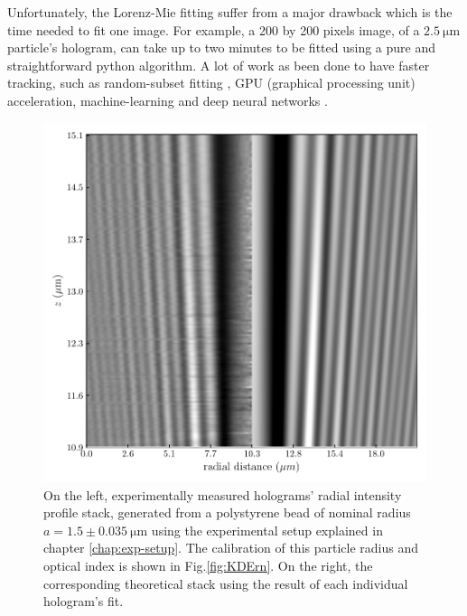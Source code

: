 Unfortunately, the Lorenz-Mie fitting suffer from a major drawback which is the time needed to fit one image. For example, a 200 by 200 pixels image, of a $2.5 ~ \mathrm{\mu m}$ particle's hologram, can take up to two minutes to be fitted using a pure and straightforward python algorithm. A lot of work as been done to have faster tracking, such as random-subset fitting \cite{dimiduk_random-subset_2014}, GPU (graphical processing unit) acceleration, machine-learning \cite{yevick_machine-learning_2014, hannel_machine-learning_2018} and deep neural networks \cite{altman_catch_2020}.

\begin{figure}[H]
	\centering
	\includegraphics{02_body/chapter2/images/test_tableau2.pdf}
	\caption{On the left, experimentally measured  holograms' radial intensity profile stack, generated from a polystyrene bead of nominal radius $a = 1.5 \pm 0.035 ~ \mathrm{\mu m} $ using the experimental setup explained in chapter \ref{chap:exp-setup}. The calibration of this particle radius and optical index is shown in Fig.\ref{fig:KDErn}. On the right, the corresponding theoretical stack using the result of each individual hologram's fit.}
	\label{fig:holo_z_fit}
\end{figure}


